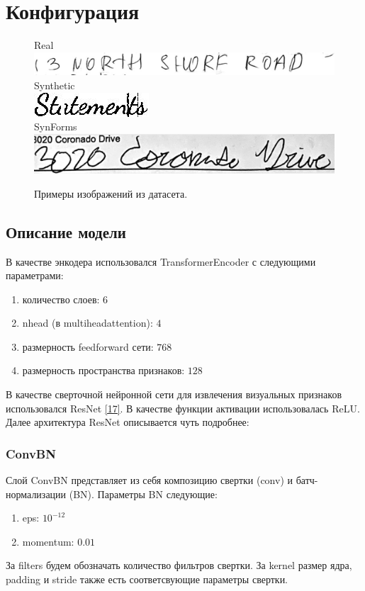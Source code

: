 \section{Конфигурация}
\label{sec:Chapter3} 

\begin{figure}
    \centering
    Real \\
    \includegraphics[scale=0.45]{./images/data/Real.jpg} \\
    Synthetic
    \\
    \includegraphics[scale=3]{./images/data/Synthetic.jpg} \\
    SynForms
    \\
    \includegraphics[scale=0.4]{./images/data/SynForms.jpg}
    \caption{\protect\hypertarget{image11}{Примеры изображений из датасета.}}
\end{figure}

\subsection{Описание модели}
В качестве энкодера использовался TransformerEncoder с следующими параметрами:
\begin{enumerate}
\item количество слоев: $6$
\item nhead (в multiheadattention): $4$
\item размерность feedforward сети: $768$
\item размерность пространства признаков: $128$
\end{enumerate}

В качестве сверточной нейронной сети для извлечения визуальных признаков использовался ResNet \hyperlink{cite.Kai15}{[17]}. В качестве функции активации использовалась ReLU. Далее архитектура ResNet описывается чуть подробнее:

\subsubsection{ConvBN}
Слой ConvBN представляет из себя композицию свертки (conv) и батч-нормализации (BN). Параметры BN следующие:
\begin{enumerate}
\item eps: $10^{-12}$
\item momentum: $0.01$
\end{enumerate}
За filters будем обозначать количество фильтров свертки. За kernel размер ядра, padding и stride также есть соответсвующие параметры свертки.

